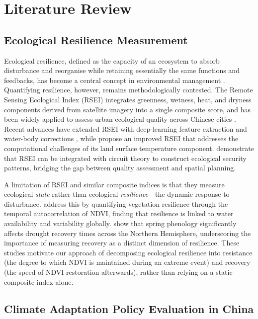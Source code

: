 \section{Literature Review}
\label{sec:literature}

\subsection{Ecological Resilience Measurement}

Ecological resilience, defined as the capacity of an ecosystem to
absorb disturbance and reorganise while retaining essentially the same
functions and feedbacks, has become a central concept in environmental
management \citep{ipcc2023cities}. Quantifying resilience, however,
remains methodologically contested. The Remote Sensing Ecological Index
(RSEI) integrates greenness, wetness, heat, and dryness components
derived from satellite imagery into a single composite score, and has
been widely applied to assess urban ecological quality across Chinese
cities \citep{chen2023evaluation,liu2024analysis,huang2024assessment}.
Recent advances have extended RSEI with deep-learning feature
extraction \citep{gong2025beyond} and water-body corrections
\citep{zhou2025dynamic}, while \citet{zhang2025urban} propose an
improved RSEI that addresses the computational challenges of its land
surface temperature component. \citet{zhang2025constructing} demonstrate
that RSEI can be integrated with circuit theory to construct ecological
security patterns, bridging the gap between quality assessment and
spatial planning.

A limitation of RSEI and similar composite indices is that they measure
ecological \emph{state} rather than ecological \emph{resilience}---the
dynamic response to disturbance. \citet{smith2023global} address this by
quantifying vegetation resilience through the temporal autocorrelation
of NDVI, finding that resilience is linked to water availability and
variability globally. \citet{li2023widespread} show that spring
phenology significantly affects drought recovery times across the
Northern Hemisphere, underscoring the importance of measuring recovery
as a distinct dimension of resilience. These studies motivate our
approach of decomposing ecological resilience into resistance (the
degree to which NDVI is maintained during an extreme event) and
recovery (the speed of NDVI restoration afterwards), rather than
relying on a static composite index alone.

\subsection{Climate Adaptation Policy Evaluation in China}

